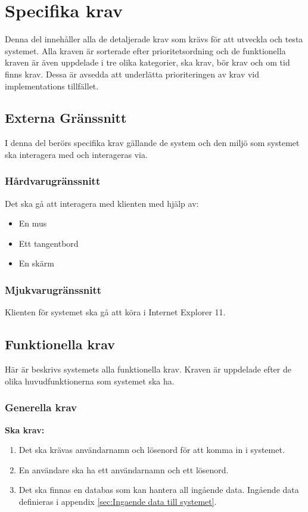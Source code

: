 \documentclass{article}
\begin{document}

\section{Specifika krav}
\label{sec:Specifika krav}
Denna del innehåller alla de detaljerade krav som krävs för att utveckla och
testa systemet. Alla kraven är sorterade efter prioritetsordning och de
funktionella kraven är även
uppdelade i tre olika kategorier, ska krav, bör krav och om tid finns krav.
Dessa är avsedda att underlätta prioriteringen av krav vid implementations
tillfället.

\subsection{Externa Gränssnitt}
\label{subsec:Externa Granssnitt}
I denna del berörs specifika krav gällande de system och den miljö som systemet
ska interagera med och interageras via.

\subsubsection{Hårdvarugränssnitt}
\label{subsec:EG-Hardvarugranssnitt}
Det ska gå att interagera med klienten med hjälp av:
\begin{itemize}
  \item En mus
  \item Ett tangentbord
  \item En skärm
\end{itemize}
\subsubsection{Mjukvarugränssnitt}

\label{subsec:EG-Mjukvarugranssnitt}
Klienten för systemet ska gå att köra i Internet Explorer 11.

\subsection{Funktionella krav}
Här är beskrivs systemets alla funktionella krav. Kraven är uppdelade efter de
olika huvudfunktionerna som systemet ska ha.
\label{subsec:Funktionella krav}
\subsubsection{Generella krav}
\label{subsec:Generella krav}
\textbf{Ska krav: }
\begin{enumerate}
    \item Det ska krävas användarnamn och lösenord för att komma in i systemet.
    \item En användare ska ha ett användarnamn och ett lösenord.
    \item Det ska finnas en databas som kan hantera all ingående data.
    Ingående data definieras i appendix \ref{sec:Ingaende data till systemet}.
\end{enumerate}
\end{document}

